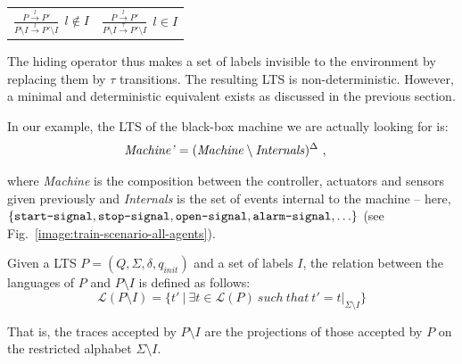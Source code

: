 \begin{center}
\begin{tabular}{cc}
$\frac{\displaystyle P \stackrel{l}{\longrightarrow} P'}{\displaystyle P \setminus I \stackrel{l}{\longrightarrow} P' \setminus I}~~l \notin I$ & 
$\frac{\displaystyle P \stackrel{l}{\longrightarrow} P'}{\displaystyle P \setminus I \stackrel{\tau}{\longrightarrow} P' \setminus I}~~l \in I$ \\
\end{tabular}
\end{center}

The hiding operator thus makes a set of labels invisible to the environment by replacing them by $\tau$ transitions. The resulting LTS is non-deterministic. However, a minimal and deterministic equivalent exists as discussed in the previous section. 

In our example, the LTS of the black-box machine we are actually looking for is:
\begin{align*}
\mbox{\emph{Machine'}} &= (\mbox{\emph{Machine}} \setminus \mbox{\emph{Internals}})^\Delta~,
\end{align*}

\noindent where \emph{Machine} is the composition between the controller, actuators and sensors given previously and \emph{Internals} is the set of events internal to the machine -- here, $\{\texttt{start-signal}, \texttt{stop-signal}, \texttt{open-signal}, \texttt{alarm-signal}, \ldots\}$ (see Fig.~\ref{image:train-scenario-all-agents}).

Given a LTS $P = (Q,\Sigma,\delta,q_{init})$ and a set of labels $I$, the relation between the languages of $P$ and $P \setminus I$ is defined as follows:
\begin{equation*}
\mathcal{L}(P \setminus I) = \{ t'~|~\exists t \in \mathcal{L}(P)~such~that~t' = t|_{\Sigma \setminus I}\}
\end{equation*}

That is, the traces accepted by $P \setminus I$ are the projections of those accepted by $P$ on the restricted alphabet $\Sigma \setminus I$.
